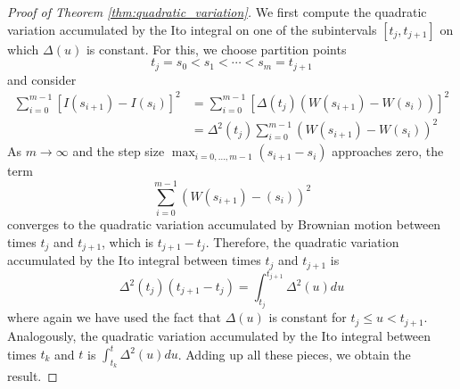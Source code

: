 \documentclass[\topdir/lecture\_notes.tex]{subfiles}
\begin{document}
\begin{optional}
\begin{proof}[Proof of Theorem \ref{thm:quadratic_variation}]
We first compute the quadratic variation accumulated by the Ito integral on one of the subintervals \(\left[t_{j}, t_{j+1}\right]\) on which \(\Delta(u)\) is constant. For this, we choose partition points
\begin{equation*}
t_{j}=s_{0}<s_{1}<\cdots<s_{m}=t_{j+1}
\end{equation*}
and consider
\begin{align}
\sum_{i=0}^{m-1}\left[I\left(s_{i+1}\right)-I\left(s_{i}\right)\right]^{2} & =\sum_{i=0}^{m-1}\left[\Delta\left(t_{j}\right)\left(W\left(s_{i+1}\right)-W\left(s_{i}\right)\right)\right]^{2} \\
& =\Delta^{2}\left(t_{j}\right) \sum_{i=0}^{m-1}\left(W\left(s_{i+1}\right)-W\left(s_{i}\right)\right)^{2}
\label{4.2.9}
\end{align}
As \(m \rightarrow \infty\) and the step size \(\max _{i=0, \ldots, m-1}\left(s_{i+1}-s_{i}\right)\) approaches zero, the term 
\[
\sum_{i=0}^{m-1}\left(W(s_{i+1})-(s_{i})\right)^{2}
\]
converges to the quadratic variation accumulated by Brownian motion between times \(t_{j}\) and \(t_{j+1}\), which is \(t_{j+1}-t_{j}\). Therefore, the quadratic variation accumulated by the Ito integral between times \(t_{j}\) and \(t_{j+1}\) is
\begin{equation*}
\Delta^{2}\left(t_{j}\right)\left(t_{j+1}-t_{j}\right)=\int_{t_{j}}^{t_{j+1}} \Delta^{2}(u) d u
\end{equation*}
where again we have used the fact that \(\Delta(u)\) is constant for \(t_{j} \leq u<t_{j+1}\). Analogously, the quadratic variation accumulated by the Ito integral between times \(t_{k}\) and \(t\) is \(\int_{t_{k}}^{t} \Delta^{2}(u) d u\). Adding up all these pieces, we obtain the result.
\end{proof}
\end{optional}
\end{document}
